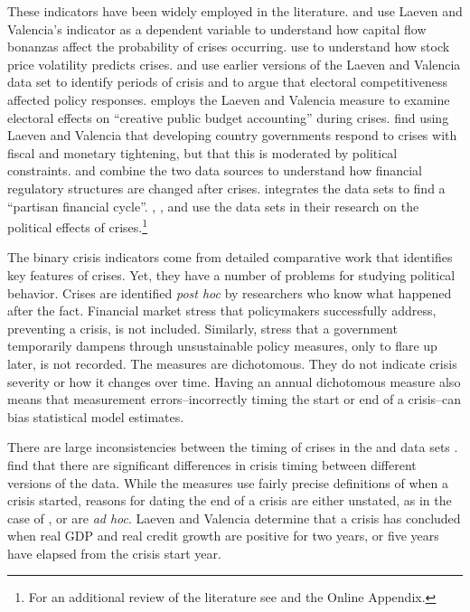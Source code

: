 \documentclass[]{article}
\begin{document}
These indicators have been widely employed in the literature. \cite{Fielding2015} and \cite{Herrera2014} use Laeven and Valencia's indicator as a dependent variable to understand how capital flow bonanzas affect the probability of crises occurring. \cite{Danielsson2015} use \cite{Reinhart2009} to understand how stock price volatility predicts crises. \cite{Keefer2007} and \cite{Rosas2006,Rosas2009} use earlier versions of the Laeven and Valencia data set to identify periods of crisis and to argue that electoral competitiveness affected policy responses. \cite{reischmann2015} employs the Laeven and Valencia measure to examine electoral effects on ``creative public budget accounting'' during crises. \cite{ha2015} find using Laeven and Valencia that developing country governments respond to crises with fiscal and monetary tightening, but that this is moderated by political constraints. \cite{Gandrud2013,Gandrud2014} and \cite{Kleibl2013} combine the two data sources to understand how financial regulatory structures are changed after crises. \cite{broz2013} integrates the data sets to find a ``partisan financial cycle''. \cite{CrespoTenorio2014}, \cite{Chwieroth2013}, and \cite{Pepinsky2012} use the data sets in their research on the political effects of crises.\footnote{For an additional review of the literature see \cite[1-3]{GandrudHallerberg2015} and the Online Appendix.}

The binary crisis indicators come from detailed comparative work that identifies key features of crises. Yet, they have a number of problems for studying political behavior. Crises are identified \emph{post hoc} by researchers who know what happened after the fact. Financial market stress that policymakers successfully address, preventing a crisis, is not included. Similarly, stress that a government temporarily dampens through unsustainable policy measures, only to flare up later, is not recorded. The measures are dichotomous. They do not indicate crisis severity or how it changes over time. Having an annual dichotomous measure also means that measurement errors--incorrectly timing the start or end of a crisis--can bias statistical model estimates.

There are large inconsistencies between the timing of crises in the \cite{laeven2013} and \cite{Reinhart2009} data sets \citep{Chaudron2014}. \cite{GandrudHallerberg2015} find that there are significant differences in crisis timing between different versions of the \cite{laeven2013} data. While the measures use fairly precise definitions of when a crisis started, reasons for dating the end of a crisis are either unstated, as in the case of \cite{Reinhart2009}, or are \emph{ad hoc}. Laeven and Valencia \citeyearpar[footnote 19]{laeven2013} determine that a crisis has concluded when real GDP and real credit growth are positive for two years, or five years have elapsed from the crisis start year.
\end{document}
